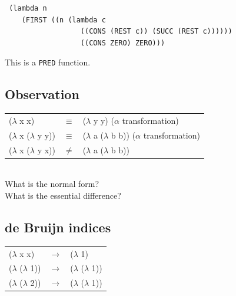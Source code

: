 \documentclass{article}
\begin{document}
\begin{flushleft}
\begin{flushleft}
\begin{verbatim}
 (lambda n
    (FIRST ((n (lambda c
                  ((CONS (REST c)) (SUCC (REST c))))))
                  ((CONS ZERO) ZERO)))
\end{verbatim}
This is a \verb|PRED| function.\\
\pagebreak
\subsection*{Observation}
\begin{tabular}{l c l}
 ($\lambda$ x x)		& $\equiv$ & ($\lambda$ y y) ($\alpha$ transformation)\\
 ($\lambda$ x ($\lambda$ y y))	& $\equiv$ & ($\lambda$ a ($\lambda$ b b)) ($\alpha$ transformation)\\
 ($\lambda$ x ($\lambda$ y x))	& $\neq$   & ($\lambda$ a ($\lambda$ b b))\\
\end{tabular}
\bigskip
\\What is the normal form?\\
What is the essential difference?\\
\end{flushleft}
\bigskip
\begin{flushleft}
\subsection*{de Bruijn indices}
\begin{tabular}{l c l}
  ($\lambda$ x x)		& $\rightarrow$		& ($\lambda$ 1)\\
  ($\lambda$ ($\lambda$ 1))	& $\rightarrow$		& ($\lambda$ ($\lambda$ 1))\\
  ($\lambda$ ($\lambda$ 2))	& $\rightarrow$		& ($\lambda$ ($\lambda$ 1))\\
\end{tabular}
\end{flushleft}
\end{flushleft}
\bigskip
\end{document}
